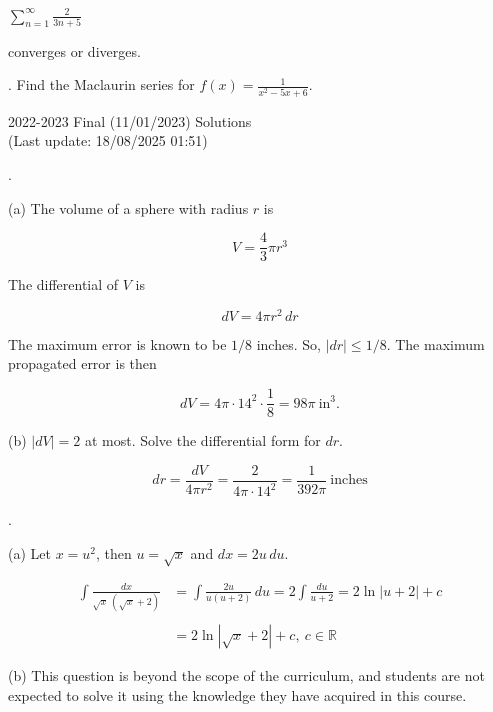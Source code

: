 \documentclass{article}
\begin{document}
\noindent $\displaystyle\sum_{n=1}^\infty\frac2{3n+5}$

\hfill

\noindent converges or diverges.

\hfill

. Find the Maclaurin series for $\displaystyle f(x)=\frac1{x^2-5x+6}$.

\newpage

\begin{center}
2022-2023 Final (11/01/2023) Solutions\\
(Last update: 18/08/2025 01:51)
\end{center}

.

\hfill

\noindent (a) The volume of a sphere with radius $r$ is

\[V=\frac43\pi r^3\]

\hfill

\noindent The differential of $V$ is

\[dV=4\pi r^2\,dr\]

\hfill

\noindent The maximum error is known to be $1/8$ inches. So, $|dr|\leq1/8$. The maximum propagated error is then

\[dV=4\pi\cdot14^2\cdot\dfrac18=\boxed{98\pi\:\text{in}^3.}\]

\hfill

\noindent (b) $|dV|=2$ at most. Solve the differential form for $dr$.

\[dr=\frac{dV}{4\pi r^2}=\frac{2}{4\pi\cdot 14^2}=\boxed{\frac1{392\pi}\:\text{inches}}\]

\hfill

.

\hfill

\noindent (a) Let $x=u^2$, then $u=\sqrt x$ and $dx=2u\,du$.

\begin{align*}\int\frac{dx}{\sqrt x\,\left(\sqrt x+2\right)}&=\int\frac{2u}{u(u+2)}\,du=2\int\frac{du}{u+2}=2\ln|u+2|+c\\\\&=\boxed{2\ln\left|\sqrt x+2\right|+c,\: c\in\mathbb{R}}\end{align*}

\hfill

\noindent (b) This question is beyond the scope of the curriculum, and students are not expected to solve it using the knowledge they have acquired in this course.
\end{document}
